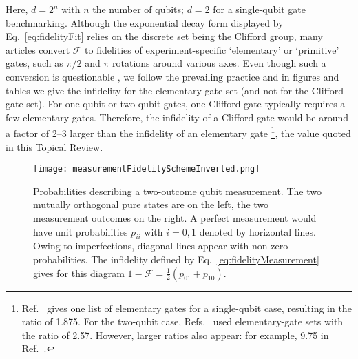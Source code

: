 \documentclass[aps, prx, showpacs, twocolumn, superscriptaddress, notitlepage, longbibliography, floatfix, nofootinbib]{revtex4-2}
\begin{document}
Here, $d=2^n$ with $n$ the number of qubits; $d=2$ for a single-qubit gate benchmarking. Although the exponential decay form displayed by Eq.~\eqref{eq:fidelityFit} relies on the discrete set being the Clifford group, many articles convert $\mathcal{F}$ to fidelities of experiment-specific `elementary' or `primitive' gates, such as $\pi/2$ and $\pi$ rotations around various axes. Even though such a conversion is questionable \cite{magesan_characterizing_2012}, we follow the prevailing practice and in figures and tables we give the infidelity for the elementary-gate set (and not for the Clifford-gate set). For one-qubit or two-qubit gates, one Clifford gate typically requires a few elementary gates. Therefore, the infidelity of a Clifford gate would be around a factor of 2--3 larger than the infidelity of an elementary gate \footnote{Ref.~\cite{epstein_investigating_2014} gives one list of elementary gates for a single-qubit case, resulting in the ratio of 1.875. For the two-qubit case, Refs.~\cite{huang_fidelity_2019, petit_universal_2020} used elementary-gate sets with the ratio of 2.57. However, larger ratios also appear: for example, 9.75 in Ref.~\cite{xue_benchmarking_2019}.}, the value quoted in this Topical Review. 

\begin{figure}
  \texttt{[image: measurementFidelitySchemeInverted.png]} \hfill
  \caption{\label{fig:measurementScheme}
  Probabilities describing a two-outcome qubit measurement. The two mutually orthogonal pure states are on the left, the two measurement outcomes on the right. A perfect measurement would have unit probabilities $p_{ii}$ with $i=0,1$ denoted by horizontal lines. Owing to imperfections, diagonal lines appear with non-zero probabilities. The infidelity defined by Eq.~\eqref{eq:fidelityMeasurement} gives for this diagram $1-\mathcal{F} =\frac{1}{2} (p_{01}+p_{10})$.}
\end{figure}
\end{document}
